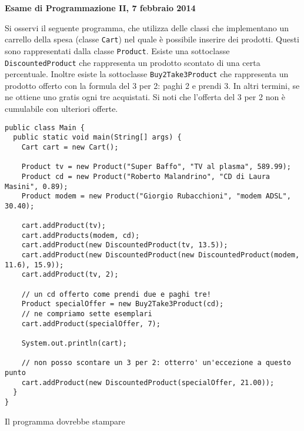 \documentclass{article}[10pt]
\begin{document}
\begin{center} {\bf Esame di Programmazione II, 7 febbraio 2014}\end{center}

Si osservi il seguente programma, che utilizza delle classi che implementano un carrello della
spesa (classe \texttt{Cart})
nel quale \`e possibile inserire dei prodotti. Questi sono rappresentati dalla classe
\texttt{Product}. Esiste una sottoclasse \texttt{DiscountedProduct} che rappresenta un
prodotto scontato di una certa percentuale. Inoltre esiste la sottoclasse
\texttt{Buy2Take3Product} che rappresenta un prodotto offerto con la formula
del 3 per 2: paghi 2 e prendi 3. In altri termini, se ne ottiene uno gratis ogni tre acquistati.
Si noti che l'offerta del 3 per 2 non \`e cumulabile con ulteriori offerte.

{\small
\begin{verbatim}
public class Main {
  public static void main(String[] args) {
    Cart cart = new Cart();

    Product tv = new Product("Super Baffo", "TV al plasma", 589.99);
    Product cd = new Product("Roberto Malandrino", "CD di Laura Masini", 0.89);
    Product modem = new Product("Giorgio Rubacchioni", "modem ADSL", 30.40);

    cart.addProduct(tv);
    cart.addProducts(modem, cd);
    cart.addProduct(new DiscountedProduct(tv, 13.5));
    cart.addProduct(new DiscountedProduct(new DiscountedProduct(modem, 11.6), 15.9));
    cart.addProduct(tv, 2);

    // un cd offerto come prendi due e paghi tre!
    Product specialOffer = new Buy2Take3Product(cd);
    // ne compriamo sette esemplari
    cart.addProduct(specialOffer, 7);

    System.out.println(cart);

    // non posso scontare un 3 per 2: otterro' un'eccezione a questo punto
    cart.addProduct(new DiscountedProduct(specialOffer, 21.00));
  }
}
\end{verbatim}}

\noindent
Il programma dovrebbe stampare
\end{document}
